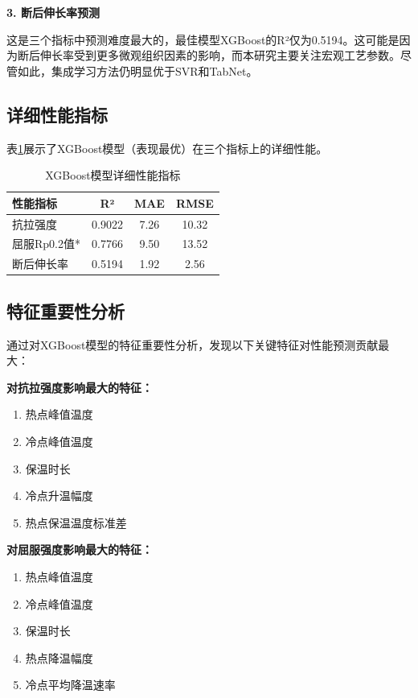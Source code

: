 \documentclass[12pt,a4paper]{article}
\begin{document}
\textbf{3. 断后伸长率预测}

这是三个指标中预测难度最大的，最佳模型XGBoost的R²仅为0.5194。这可能是因为断后伸长率受到更多微观组织因素的影响，而本研究主要关注宏观工艺参数。尽管如此，集成学习方法仍明显优于SVR和TabNet。

\subsection{详细性能指标}

表\ref{tab:detailed_performance}展示了XGBoost模型（表现最优）在三个指标上的详细性能。

\begin{table}[H]
\centering
\caption{XGBoost模型详细性能指标}
\label{tab:detailed_performance}
\begin{tabular}{lccc}
\toprule
性能指标 & R² & MAE & RMSE \\
\midrule
抗拉强度 & 0.9022 & 7.26 & 10.32 \\
屈服Rp0.2值* & 0.7766 & 9.50 & 13.52 \\
断后伸长率 & 0.5194 & 1.92 & 2.56 \\
\bottomrule
\end{tabular}
\end{table}

\subsection{特征重要性分析}

通过对XGBoost模型的特征重要性分析，发现以下关键特征对性能预测贡献最大：

\textbf{对抗拉强度影响最大的特征：}
\begin{enumerate}
\item 热点峰值温度
\item 冷点峰值温度
\item 保温时长
\item 冷点升温幅度
\item 热点保温温度标准差
\end{enumerate}

\textbf{对屈服强度影响最大的特征：}
\begin{enumerate}
\item 热点峰值温度
\item 冷点峰值温度
\item 保温时长
\item 热点降温幅度
\item 冷点平均降温速率
\end{enumerate}
\end{document}
